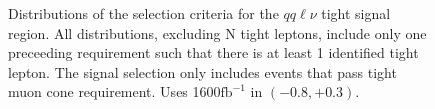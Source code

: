 \begin{figure}[htpb]%
\caption{ Distributions of the selection criteria for the $qq\ell\nu$ tight signal region. All distributions, excluding N tight leptons, include only one preceeding requirement such that there is at least 1 identified tight lepton. The signal selection only includes events that pass tight muon cone requirement. Uses 1600$\text{fb}^{-1}$ in $(-0.8,+0.3)$.}
\centering
    \begin{minipage}{0.49\textwidth}
        \centering
    \end{minipage}\hfill
    \begin{minipage}{0.49\textwidth}
\end{minipage}
\end{figure}
